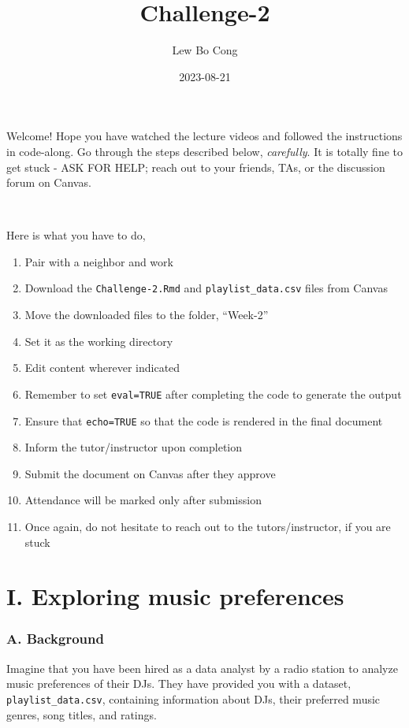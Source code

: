 \documentclass[
]{article}
\title{Challenge-2}
\author{Lew Bo Cong}
\date{2023-08-21}
\begin{document}
\maketitle

Welcome! Hope you have watched the lecture videos and followed the
instructions in code-along. Go through the steps described below,
\emph{carefully}. It is totally fine to get stuck - ASK FOR HELP; reach
out to your friends, TAs, or the discussion forum on Canvas.

~

Here is what you have to do,

\begin{enumerate}
\def\labelenumi{\arabic{enumi}.}
\item
  Pair with a neighbor and work
\item
  Download the \texttt{Challenge-2.Rmd} and \texttt{playlist\_data.csv}
  files from Canvas
\item
  Move the downloaded files to the folder, ``Week-2''
\item
  Set it as the working directory
\item
  Edit content wherever indicated
\item
  Remember to set \texttt{eval=TRUE} after completing the code to
  generate the output
\item
  Ensure that \texttt{echo=TRUE} so that the code is rendered in the
  final document
\item
  Inform the tutor/instructor upon completion
\item
  Submit the document on Canvas after they approve
\item
  Attendance will be marked only after submission
\item
  Once again, do not hesitate to reach out to the tutors/instructor, if
  you are stuck
\end{enumerate}

\hypertarget{i.-exploring-music-preferences}{%
\section{I. Exploring music
preferences}\label{i.-exploring-music-preferences}}

\hypertarget{a.-background}{%
\subsubsection{A. Background}\label{a.-background}}

Imagine that you have been hired as a data analyst by a radio station to
analyze music preferences of their DJs. They have provided you with a
dataset, \texttt{playlist\_data.csv}, containing information about DJs,
their preferred music genres, song titles, and ratings.
\end{document}
